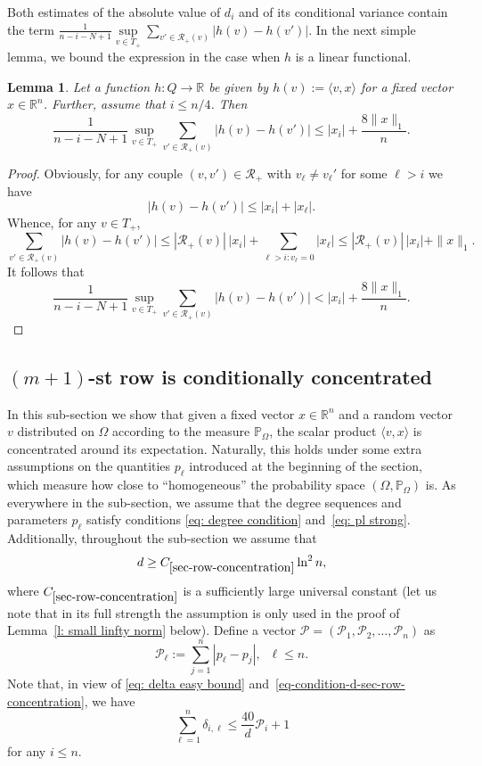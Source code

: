 \documentclass[12pt]{article}
\newtheorem{lemma}[theorem]{Lemma}
\theoremstyle{definition}
\theoremstyle{plain}
\newcommand{\R}{\mathbb{R}}
\def\Prob{{\mathbb P}}
\def\pvector{{\mathcal P}}
\def\relation{{\mathcal R}}
\begin{document}
Both estimates of the absolute value of $d_i$ and of its conditional variance
contain the term $\frac{1}{n-i-N+1}\sup\limits_{v\in T_+}\sum\limits_{v'\in \relation_+(v)}\big|h(v)-h(v')\big|$.
In the next simple lemma, we bound the expression in the case when $h$ is a linear functional.

\begin{lemma}\label{l: average of hv}
Let a function $h:Q\to\R$ be given by $h(v):=\langle v,x\rangle$
for a fixed vector $x\in\R^n$. Further, assume that $i\leq n/4$. Then
$$\frac{1}{n-i-N+1}\sup\limits_{v\in T_+}\sum\limits_{v'\in \relation_+(v)}\big|h(v)-h(v')\big|
\leq |x_i|+\frac{8\|x\|_1}{n}.$$
\end{lemma}
\begin{proof}
Obviously, for any couple $(v,v')\in \relation_+$ with $v_\ell\neq v_\ell'$ for some $\ell>i$ we have
$$\big|h(v)-h(v')\big|\leq |x_i|+|x_\ell|.$$
Whence, for any $v\in T_+$,
$$\sum\limits_{v'\in \relation_+(v)}\big|h(v)-h(v')\big|
\leq |\relation_+(v)|\,|x_i|+\sum_{\ell>i: v_\ell=0}|x_\ell|\leq |\relation_+(v)|\,|x_i|+\|x\|_1.$$
It follows that
$$\frac{1}{n-i-N+1}\sup\limits_{v\in T_+}\sum\limits_{v'\in \relation_+(v)}\big|h(v)-h(v')\big|
< |x_i|+\frac{8\|x\|_1}{n}.$$ 
\end{proof}


\subsection{$(m+1)$-st row is conditionally concentrated}\label{sec-row-concentration}

In this sub-section we show that given a fixed vector $x\in\R^n$ and
a random vector $v$ distributed on $\Omega$ according to the measure $\Prob_\Omega$,
the scalar product $\langle v,x\rangle$ is concentrated around its expectation.
Naturally, this holds under some extra assumptions on the quantities $p_\ell$ introduced at the
beginning of the section, which measure how close to ``homogeneous'' the probability space $(\Omega,\Prob_\Omega)$
is. As everywhere in the sub-section, we assume that the degree sequences and parameters $p_\ell$ satisfy conditions \eqref{eq: degree condition}
and~\eqref{eq: pl strong}.
Additionally, throughout the sub-section we assume that
\begin{equation}\label{eq-condition-d-sec-row-concentration}
d\geq C_{\ref{sec-row-concentration}}\ln^2 n,
\end{equation}
where  $C_{\ref{sec-row-concentration}}$ is a sufficiently large universal constant
(let us note that in its full strength the assumption is only used in the proof of Lemma~\ref{l: small linfty norm} below).
Define a vector $\pvector=(\pvector_1,\pvector_2,\ldots,\pvector_n)$ as
$$\pvector_\ell:=\sum_{j=1}^n |p_\ell-p_j|,\;\;\ell\leq n.$$
Note that, in view of \eqref{eq: delta easy bound} and~\eqref{eq-condition-d-sec-row-concentration}, we have
\begin{equation}\label{eq: delta via pvector}
\sum_{\ell=1}^n \delta_{i,\ell}\leq \frac{40}{d}\pvector_i+1
\end{equation}
for any $i\leq n$.
\end{document}
